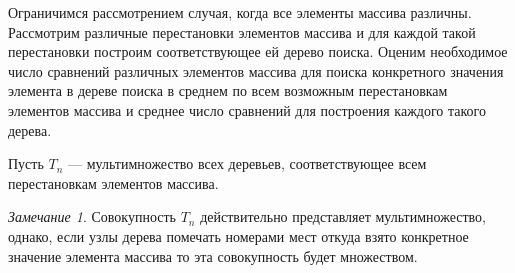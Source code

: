 \documentclass[12pt,a4paper]{article}
\theoremstyle{plain}
\theoremstyle{definition}
\theoremstyle{remark}
\newtheorem*{remark}{Замечание}
\begin{document}
Ограничимся рассмотрением случая, когда все элементы массива различны. Рассмотрим различные перестановки элементов массива и для каждой такой перестановки построим соответствующее ей дерево поиска. Оценим необходимое число сравнений различных элементов массива для поиска конкретного значения элемента в дереве поиска в среднем по всем возможным перестановкам элементов массива и среднее число сравнений для построения каждого такого дерева.

Пусть $T_n$ --- мультимножество всех деревьев, соответствующее всем перестановкам элементов массива. 

\begin{remark}
Совокупность $T_n$ действительно представляет мультимножество, однако, если узлы дерева помечать номерами мест откуда взято конкретное значение элемента массива то эта совокупность будет множеством.
\end{remark}
\end{document}
